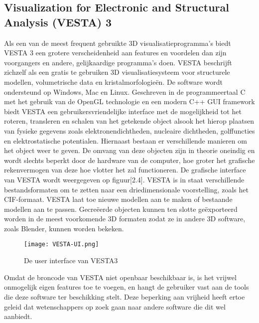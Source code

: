 \subsection{Visualization for Electronic and Structural Analysis (VESTA) 3}
Als een van de meest frequent gebruikte 3D visualisatieprogramma’s biedt VESTA 3 een grotere verscheidenheid aan features en voordelen dan zijn voorgangers en andere, gelijkaardige programma’s doen. VESTA beschrijft zichzelf als een gratis te gebruiken 3D visualisatiesysteem voor structurele modellen, volumetrische data en kristalmorfologieën. \citep*{VESTA1} De software wordt ondersteund op Windows, Mac en Linux. Geschreven in de programmeertaal C met het gebruik van de OpenGL technologie en een modern C++ GUI framework biedt VESTA een gebruikersvriendelijke interface met de mogelijkheid tot het roteren, transleren en schalen van het getekende object alsook het hierop plaatsen van fysieke gegevens zoals elektronendichtheden, nucleaire dichtheden, golffuncties en elektrostatische potentialen. Hiernaast bestaan er verschillende manieren om het object weer te geven. De omvang van deze objecten zijn in theorie oneindig en wordt slechts beperkt door de hardware van de computer, hoe groter het grafische rekenvermogen van deze hoe vlotter het zal functioneren. De grafische interface van VESTA wordt weergegeven op figuur[2.4]. VESTA is in staat verschillende bestandsformaten om te zetten naar een driedimensionale voorstelling, zoals het CIF-formaat. VESTA laat toe nieuwe modellen aan te maken of bestaande modellen aan te passen. Gecreëerde objecten kunnen ten slotte geëxporteerd worden in de meest voorkomende 3D formaten zodat ze in andere 3D software, zoals Blender, kunnen worden bekeken.
\\
\begin{figure}[H]
\texttt{[image: VESTA-UI.png]}
\caption{De user interface van VESTA3}
\end{figure}

\par
 Omdat de broncode van VESTA niet openbaar beschikbaar is, is het vrijwel onmogelijk eigen features toe te voegen, en hangt de gebruiker vast aan de tools die deze software ter beschikking stelt. Deze beperking aan vrijheid heeft ertoe geleid dat wetenschappers op zoek gaan naar andere software die dit wel aanbiedt.

